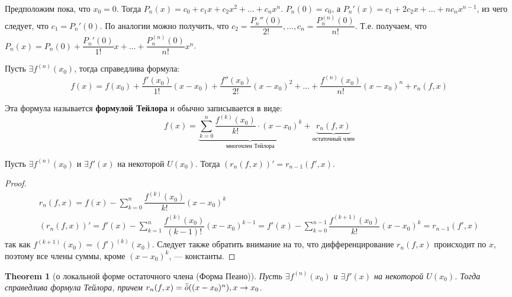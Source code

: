 \documentclass[a4paper]{article}
\theoremstyle{named}
\newtheorem*{namedtheorem}{Theorem}
\begin{document}
\begin{colloq}
		Предположим пока, что $x_0 = 0$. Тогда $P_n(x) = c_0 + c_1x + c_2x^2 + \dots + c_nx^n$. $P_n(0) = c_0$, а $P_n'(x) = c_1 + 2c_2x + \dots + nc_nx^{n - 1}$, из чего следует, что $c_1 = P_n'(0)$. По аналогии можно получить, что $c_2 = \dfrac{P_n''(0)}{2!}, \dots, c_n = \dfrac{P_n^{(n)}(0)}{n!}$. Т.е. получаем, что $P_n(x) = P_n(0) + \dfrac{P_n'(0)}{1!}x + \dots + \dfrac{P_n^{(n)}(0)}{n!} x^n$.

		Пусть $\exists f^{(n)}(x_0)$, тогда справедлива формула:
		\begin{equation*}
			f(x) = f(x_0) + \dfrac{f'(x_0)}{1!}(x - x_0) + \dfrac{f''(x_0)}{2!}(x - x_0)^2 + \dots + \dfrac{f^{(n)}(x_0)}{n!}(x - x_0)^n + r_n(f, x)
		\end{equation*}

		Эта формула называется \textbf{формулой Тейлора} и обычно записывается в виде:
		\begin{equation*}
			f(x) = \underbrace{\sum_{k = 0}^n \dfrac{f^{(k)}(x_0)}{k!} \cdot (x - x_0)^k}_{\text{многочлен Тейлора}} + \underbrace{r_n(f, x)}_{\text{остаточный член}}
		\end{equation*}

		\begin{lemma}
			Пусть $\exists f^{(n)}(x_0)$ и $\exists f'(x)$ на некоторой $U(x_0)$. Тогда $(r_n(f, x))' = r_{n - 1}(f', x)$.
		\end{lemma}

		\begin{proof}
			\[\begin{gathered}
				r_n(f, x) = f(x) - \sum_{k = 0}^n \dfrac{f^{(k)}(x_0)}{k!} (x - x_0)^k \\
				(r_n(f, x))' = f'(x) - \sum_{k = 1}^n \dfrac{f^{(k)}(x_0)}{(k - 1)!} (x - x_0)^{k - 1}
				= f'(x) - \sum_{k = 0}^{n - 1} \dfrac{f^{(k + 1)}(x_0)}{k!}(x - x_0)^k = r_{n - 1}(f', x)
			\end{gathered}\]
			так как $f^{(k + 1)}(x_0) = (f')^{(k)}(x_0)$. Следует также обратить внимание на то, что дифференцирование $r_n(f, x)$ происходит по $x$, поэтому все члены суммы, кроме $(x - x_0)^k$, --- константы.
		\end{proof}

		\begin{namedtheorem}[о локальной форме остаточного члена (Форма Пеано)]
			Пусть $\exists f^{(n)}(x_0)$ и $\exists f'(x)$ на некоторой $U(x_0)$. Тогда справедлива формула Тейлора, причем $r_n(f, x) = \bar{\bar{o}}((x - x_0)^n), x \to x_0$.
		\end{namedtheorem}


\end{colloq}
\end{document}
